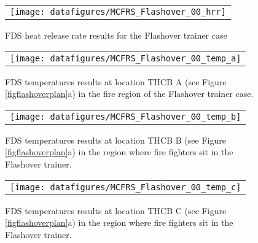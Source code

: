 \documentclass[11pt]{book}
\begin{document}
\begin{figure}[\figoptions]
\begin{center}
\begin{tabular}{c}
 \texttt{[image: datafigures/MCFRS\_Flashover\_00\_hrr]}\\
\end{tabular}
\end{center}
\caption {FDS heat release rate results for the Flashover trainer case}
\label{figflashoverhrr}%
\end{figure}

\begin{figure}[\figoptions]
\begin{center}
\begin{tabular}{c}
 \texttt{[image: datafigures/MCFRS\_Flashover\_00\_temp\_a]}\\
\end{tabular}
\end{center}
\caption {FDS temperatures results at location THCB A (see Figure \ref{figflashoverplan}a) in the
fire region of the Flashover trainer case.}
\label{figflashovertempa}%
\end{figure}

\begin{figure}[\figoptions]
\begin{center}
\begin{tabular}{c}
 \texttt{[image: datafigures/MCFRS\_Flashover\_00\_temp\_b]}\\
\end{tabular}
\end{center}
\caption {FDS temperatures results at location THCB B (see Figure \ref{figflashoverplan}a) in the region where fire fighters sit in the Flashover trainer.}
\label{figflashovertempb}%
\end{figure}
\begin{figure}[\figoptions]
\begin{center}
\begin{tabular}{c}
 \texttt{[image: datafigures/MCFRS\_Flashover\_00\_temp\_c]}\\
\end{tabular}
\end{center}
\caption {FDS temperatures results at location THCB C (see Figure \ref{figflashoverplan}a) in the region where fire fighters sit in the Flashover trainer.}
\label{figflashovertempb}%
\end{figure}

\end{document}
